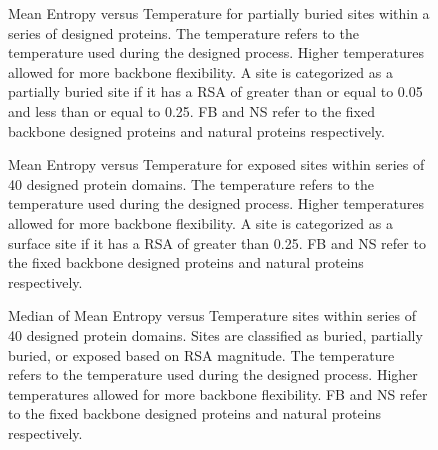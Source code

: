 \documentclass[12pt]{article}
\begin{document}
\begin{figure}[H]
\caption{Mean Entropy versus Temperature for partially buried sites within a series of designed proteins. The temperature refers to the temperature used during the designed process. Higher temperatures allowed for more backbone flexibility. A site is categorized as a partially buried site if it has a RSA of greater than or equal to 0.05 and less than or equal to 0.25. FB and NS refer to the fixed backbone designed proteins and natural proteins respectively.}
\label{Inter_Entropy_Noah}
\end{figure}

\begin{figure}[H]
\caption{Mean Entropy versus Temperature for exposed sites within series of 40 designed protein domains. The temperature refers to the temperature used during the designed process. Higher temperatures allowed for more backbone flexibility. A site is categorized as a surface site if it has a RSA of greater than 0.25. FB and NS refer to the fixed backbone designed proteins and natural proteins respectively.}
\label{Surface_Entropy_Noah}
\end{figure}

\begin{figure}[H]
\caption{Median of Mean Entropy versus Temperature sites within series of 40 designed protein domains.  Sites are classified as buried, partially buried, or exposed based on RSA magnitude. The temperature refers to the temperature used during the designed process. Higher temperatures allowed for more backbone flexibility. FB and NS refer to the fixed backbone designed proteins and natural proteins respectively.}
\label{Postion_Entropy_Noah}
\end{figure}
\end{document}
